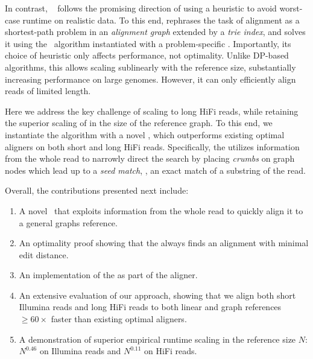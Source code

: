 In contrast, \astarix~\citep{ivanov2020astarix} follows the promising direction
of using a heuristic to avoid worst-case runtime on realistic data. To this end,
\astarix rephrases the task of alignment as a shortest-path problem in an
\emph{alignment graph} extended by a \emph{trie index}, and solves it using the
\A~algorithm instantiated with a problem-specific \prefixh. Importantly, its
choice of heuristic only affects performance, not optimality.
%
Unlike DP-based algorithms, this \prefixh allows scaling sublinearly with the
reference size, substantially increasing performance on large genomes. However,
it can only efficiently align reads of limited length.

%
Here we address the key challenge of scaling to long HiFi reads, while
retaining the superior scaling of \astarix in the size of the reference graph.
%
To this end, we instantiate the \A algorithm with a novel \seedh, which
outperforms existing optimal aligners on both short and long HiFi reads.
%
Specifically, the \seedh utilizes information from the whole read to narrowly
direct the \A search by placing \emph{crumbs} on graph nodes which lead up to a
\emph{seed match}, \ie, an exact match of a substring of the read.

Overall, the contributions presented next include:
%
\begin{enumerate}
    \item A novel \A~\seedh that exploits information from the whole read to
    quickly align it to a general graphs reference.
    \item An optimality proof showing that the \seedh always finds an alignment
    with minimal edit distance.
	\item An implementation of the \seedh as part of the \astarix aligner.
    \item An extensive evaluation of our approach, showing that we align both
    short Illumina reads and long HiFi reads to both linear and graph references
    $\geq 60 \times$ faster than existing optimal aligners.
    \item A demonstration of superior empirical runtime scaling in the reference
    size $N$: $N^{0.46}$ on Illumina reads and $N^{0.11}$ on HiFi reads.
\end{enumerate}
